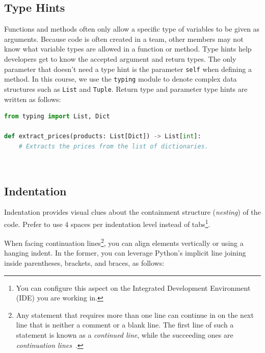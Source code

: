 \documentclass{tufte-handout}
\begin{document}
\subsection{Type Hints}
Functions and methods often only allow a specific type of variables to be given as arguments.
Because code is often created in a team, other members may not know what variable types are allowed in a function or method.
Type hints help developers get to know the accepted argument and return types.
The only parameter that doesn't need a type hint is the parameter \texttt{self} when defining a method.
In this course, we use the \texttt{typing} module to denote complex data structures such as \texttt{List} and \texttt{Tuple}.
Return type and parameter type hints are written as follows:

%




\begin{lstlisting}[numbers=none,language=python]
from typing import List, Dict

def extract_prices(products: List[Dict]) -> List[int]:
    # Extracts the prices from the list of dictionaries.
\end{lstlisting}

\


\subsection{Indentation}

Indentation provides visual clues about the containment structure (\emph{nesting\/}) of the code.
Prefer to use 4 spaces per indentation level instead of tabs\footnote{You can configure this aspect on the Integrated Development Environment (IDE) you are working in.}.

When facing continuation lines\footnote{Any statement that requires more than one line can continue in on the next line that is neither a comment or a blank line. The first line of such a statement is known as a \emph{continued line}, while the succeeding ones are \emph{continuation lines}~\cite{ibm2022continuation}.}, you can align elements vertically or using a hanging indent.
In the former, you can leverage Python's implicit line joining inside parentheses, brackets, and braces, as follows:
\end{document}
